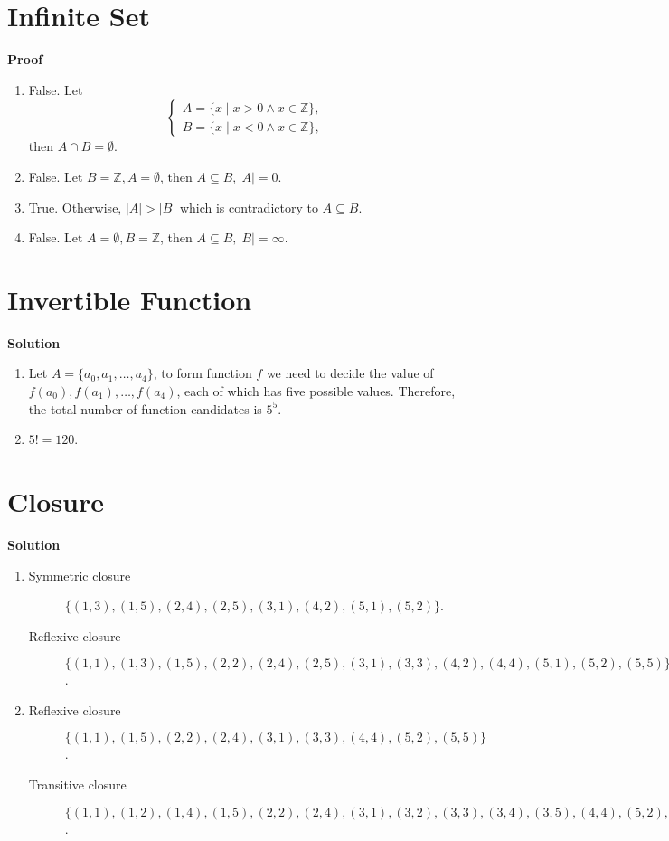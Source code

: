 \documentclass{../../cls/sig-alternate-05-2015}
\begin{document}
\section{Infinite Set}
\textbf{Proof}\begin{enumerate}[label=(\alph*)]
	\item False. Let \begin{equation}
		\begin{cases}
		A = \{x \mid x > 0 \land x \in \mathbb{Z}\},\\
		B = \{x \mid x < 0 \land x \in \mathbb{Z}\},
		\end{cases}
	\end{equation} then $A \cap B = \emptyset$.
	\item False. Let $B = \mathbb{Z}, A = \emptyset$, then $A \subseteq B, \left|A\right| = 0$.
	\item True. Otherwise, $\left|A\right| > \left|B\right|$ which is contradictory to $A \subseteq B$.
	\item False. Let $A = \emptyset, B = \mathbb{Z}$, then $A \subseteq B, \left|B\right| = \infty$.
\end{enumerate}

\section{Invertible Function}
\textbf{Solution}\begin{enumerate}[label=(\alph*)]
	\item Let $A = \{a_0, a_1, \ldots, a_4\}$, to form function $f$ we need to decide the value of $f(a_0), f(a_1), \ldots, f(a_4)$, each of which has five possible values. Therefore, the total number of function candidates is $5^5$.
	\item $5! = 120$.
\end{enumerate}

\section{Closure}
\textbf{Solution}\begin{enumerate}[label=(\alph*)]
	\item \begin{description}
		\item[Symmetric closure] $\{(1, 3), (1, 5), (2, 4), (2, 5), (3, 1), (4, 2), (5, 1), (5, 2)\}$.
		\item[Reflexive closure] $\{(1, 1), (1, 3), (1, 5), (2, 2), (2, 4), (2, 5), (3, 1), (3, 3), (4, 2), (4, 4), (5, 1), (5, 2), (5, 5)\}$.
	\end{description}
	\item \begin{description}
		\item[Reflexive closure] $\{(1, 1), (1, 5), (2, 2), (2, 4), (3, 1), (3, 3), (4, 4), (5, 2), (5, 5)\}$.
		\item[Transitive closure] $\{(1, 1), (1, 2), (1, 4), (1, 5), (2, 2), (2, 4), (3, 1), (3, 2), (3, 3), (3, 4), (3, 5), (4, 4), (5, 2), (5, 4), (5, 5)\}$.
	\end{description}
\end{enumerate}
\end{document}
